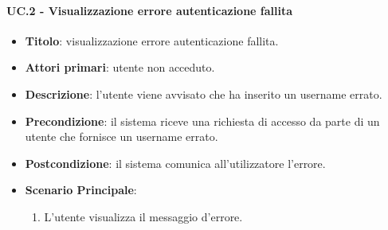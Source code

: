 	\paragraph{UC\theuccount.2 - Visualizzazione errore autenticazione fallita}
		\begin{itemize}
			\item \textbf{Titolo}: visualizzazione errore autenticazione fallita.
			\item \textbf{Attori primari}: utente non acceduto.
			\item \textbf{Descrizione}: l'utente viene avvisato che ha inserito un username errato.
			\item \textbf{Precondizione}: il sistema riceve una richiesta di accesso da parte di un utente che
			fornisce un username errato. 
			\item \textbf{Postcondizione}: il sistema comunica all'utilizzatore l'errore.
			\item \textbf{Scenario Principale}:
			\begin{enumerate}
				\item L'utente visualizza il messaggio d'errore.
			\end{enumerate}
		\end{itemize}



